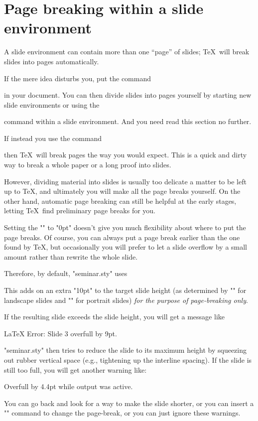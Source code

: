 \section{Page breaking within a slide environment\label{S-pagebreak}}

A slide environment can contain more than one ``page'' of slides; \TeX\ will
break slides into pages automatically.

If the mere idea disturbs you, put the command
\begin{LVerbatim}
  \extraslideheight{10in}
\end{LVerbatim}
in your document. You can then divide slides into pages yourself by starting
new slide environments or using the
\begin{MD}
  \newslide
\end{MD}
command within a slide environment. And you need read this section no further.

If instead you use the command
\begin{LVerbatim}
  \extraslideheight{0pt}
\end{LVerbatim}
then \TeX\ will break pages the way you would expect. This is a quick and
dirty way to break a whole paper or a long proof into slides.

However, dividing material into slides is usually too delicate a matter to be
left up to \TeX, and ultimately you will make all the page breaks yourself. On
the other hand, automatic page breaking can still be helpful at the early
stages, letting \TeX\ find preliminary page breaks for you.

Setting the "\extraslideheight" to "0pt" doesn't give you much flexibility
about where to put the page breaks. Of course, you can always put a page break
earlier than the one found by \TeX, but occasionally you will prefer to let a
slide overflow by a small amount rather than rewrite the whole slide.

Therefore, by default, "seminar.sty" uses\MainIndex{\extraslideheight}%
\begin{LVerbatim}
  \extraslideheight{10pt}
\end{LVerbatim}
This adds on an extra "10pt" to the target slide height (as determined by
"\slideheight" for landscape slides and "\slidewidth" for portrait slides)
{\em for the purpose of page-breaking only}.

If the resulting slide exceeds the slide height, you will get a message like
\begin{LVerbatim}
  LaTeX Error: Slide 3 overfull by 9pt.
\end{LVerbatim}
"seminar.sty" then tries to reduce the slide to its maximum height by
squeezing out rubber vertical space (e.g., tightening up the interline
spacing). If the slide is still too full, you will get another warning like:
\begin{LVerbatim}
  Overfull \vbox by 4.4pt while output was active.
\end{LVerbatim}
You can go back and look for a way to make the slide shorter, or you can
insert a "\newslide" command to change the page-break, or you can just ignore
these warnings.

